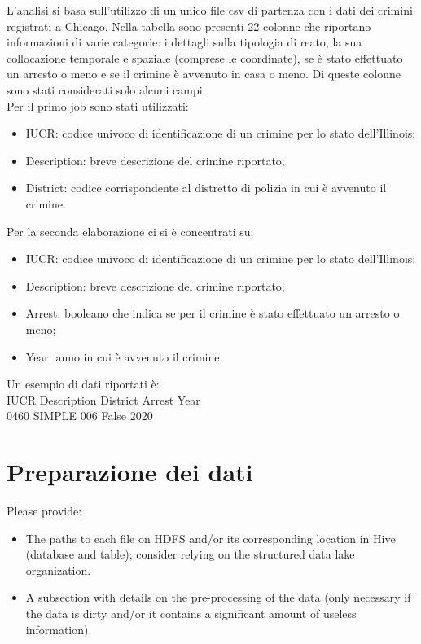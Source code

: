 \documentclass[10pt]{article}
\begin{document}
L'analisi si basa sull'utilizzo di un unico file csv di partenza con i dati dei crimini registrati a Chicago.
Nella tabella sono presenti 22 colonne che riportano informazioni di varie categorie: i dettagli sulla tipologia di reato, la sua collocazione temporale e spaziale (comprese le coordinate), se è stato effettuato un arresto o meno e se il crimine è avvenuto in casa o meno. Di queste colonne sono stati considerati solo alcuni campi.\\
Per il primo job sono stati utilizzati:
\begin{itemize}
\item IUCR: codice univoco di identificazione di un crimine per lo stato dell'Illinois;
\item Description: breve descrizione del crimine riportato;
\item District: codice corrispondente al distretto di polizia in cui è avvenuto il crimine.
\end{itemize}
Per la seconda elaborazione ci si è concentrati su:
\begin{itemize}
\item IUCR: codice univoco di identificazione di un crimine per lo stato dell'Illinois;
\item Description: breve descrizione del crimine riportato;
\item Arrest: booleano che indica se per il crimine è stato effettuato un arresto o meno;
\item Year: anno in cui è avvenuto il crimine.
\end{itemize}

Un esempio di dati riportati è:\\
IUCR Description District Arrest Year \\
0460   SIMPLE      006    False  2020



\section{Preparazione dei dati}
Please provide:
\begin{itemize}
\item The paths to each file on HDFS and/or its corresponding location in Hive (database and table); consider relying on the structured data lake organization.
\item A subsection with details on the pre-processing of the data (only necessary if the data is dirty and/or it contains a significant amount of useless information).
\end{itemize}
\end{document}
